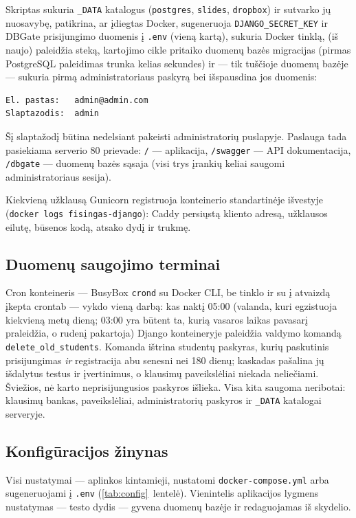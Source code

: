 \documentclass[11pt,a4paper]{article}
\newcommand{\code}[1]{\texttt{#1}}
\begin{document}
Skriptas sukuria \code{\_DATA} katalogus (\code{postgres},
\code{slides}, \code{dropbox}) ir sutvarko jų nuosavybę, patikrina,
ar įdiegtas Docker, sugeneruoja \code{DJANGO\_SECRET\_KEY} ir DBGate
prisijungimo duomenis į \code{.env} (vieną kartą), sukuria Docker
tinklą, (iš naujo) paleidžia steką, kartojimo cikle pritaiko duomenų
bazės migracijas (pirmas PostgreSQL paleidimas trunka kelias
sekundes) ir — tik tuščioje duomenų bazėje — sukuria pirmą
administratoriaus paskyrą bei išspausdina jos duomenis:

\begin{lstlisting}
El. pastas:   admin@admin.com
Slaptazodis:  admin
\end{lstlisting}

Šį slaptažodį būtina nedelsiant pakeisti administratorių puslapyje.
Paslauga tada pasiekiama serverio 80 prievade: \code{/} —
aplikacija, \code{/swagger} — API dokumentacija, \code{/dbgate} —
duomenų bazės sąsaja (visi trys įrankių keliai saugomi
administratoriaus sesija).

Kiekvieną užklausą Gunicorn registruoja konteinerio standartinėje
išvestyje (\code{docker logs fisingas-django}): Caddy persiųstą
kliento adresą, užklausos eilutę, būsenos kodą, atsako dydį ir trukmę.

\subsection{Duomenų saugojimo terminai}

Cron konteineris — BusyBox \code{crond} su Docker CLI, be tinklo ir
su į atvaizdą įkepta crontab — vykdo vieną darbą: kas naktį 05:00
(valanda, kuri egzistuoja kiekvieną metų dieną; 03:00 yra būtent ta,
kurią vasaros laikas pavasarį praleidžia, o rudenį pakartoja) Django
konteineryje paleidžia valdymo komandą \code{delete\_old\_students}. Komanda ištrina studentų paskyras,
kurių paskutinis prisijungimas \emph{ir} registracija abu senesni nei
180 dienų; kaskadas pašalina jų išdalytus testus ir įvertinimus, o
klausimų paveikslėliai niekada neliečiami. Šviežios, nė karto
neprisijungusios paskyros išlieka. Visa kita saugoma neribotai:
klausimų bankas, paveikslėliai, administratorių paskyros ir
\code{\_DATA} katalogai serveryje.

\subsection{Konfigūracijos žinynas}

Visi nustatymai — aplinkos kintamieji, nustatomi
\code{docker-compose.yml} arba sugeneruojami į \code{.env}
(\ref{tab:config}~lentelė). Vienintelis aplikacijos lygmens
nustatymas — testo dydis — gyvena duomenų bazėje ir redaguojamas iš
skydelio.
\end{document}
